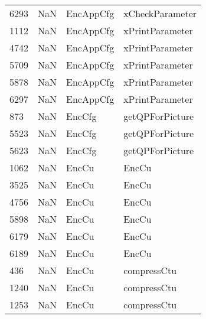\begin{tabular}{llll}
6293 &                   NaN &                  EncAppCfg &                           xCheckParameter \\
1112 &                   NaN &                  EncAppCfg &                           xPrintParameter \\
4742 &                   NaN &                  EncAppCfg &                           xPrintParameter \\
5709 &                   NaN &                  EncAppCfg &                           xPrintParameter \\
5878 &                   NaN &                  EncAppCfg &                           xPrintParameter \\
6297 &                   NaN &                  EncAppCfg &                           xPrintParameter \\
873  &                   NaN &                     EncCfg &                           getQPForPicture \\
5523 &                   NaN &                     EncCfg &                           getQPForPicture \\
5623 &                   NaN &                     EncCfg &                           getQPForPicture \\
1062 &                   NaN &                      EncCu &                                     EncCu \\
3525 &                   NaN &                      EncCu &                                     EncCu \\
4756 &                   NaN &                      EncCu &                                     EncCu \\
5898 &                   NaN &                      EncCu &                                     EncCu \\
6179 &                   NaN &                      EncCu &                                     EncCu \\
6189 &                   NaN &                      EncCu &                                     EncCu \\
436  &                   NaN &                      EncCu &                               compressCtu \\
1240 &                   NaN &                      EncCu &                               compressCtu \\
1253 &                   NaN &                      EncCu &                               compressCtu \\

\end{tabular}
